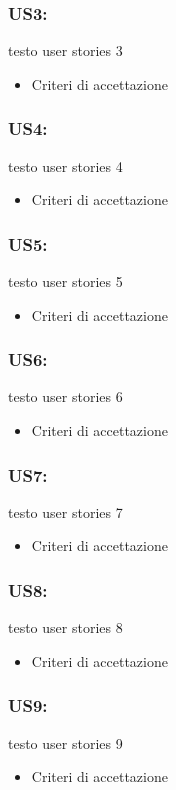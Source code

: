\documentclass[12pt]{article}
\begin{document}
\subsubsection{US3:}
testo user stories 3
\begin{itemize}
    \item Criteri di accettazione
\end{itemize}
\subsubsection{US4:}
testo user stories 4
\begin{itemize}
    \item Criteri di accettazione
\end{itemize}
\subsubsection{US5:}
testo user stories 5
\begin{itemize}
    \item Criteri di accettazione
\end{itemize}
\subsubsection{US6:}
testo user stories 6
\begin{itemize}
    \item Criteri di accettazione
\end{itemize}
\subsubsection{US7:}
testo user stories 7
\begin{itemize}
    \item Criteri di accettazione
\end{itemize}
\subsubsection{US8:}
testo user stories 8
\begin{itemize}
    \item Criteri di accettazione
\end{itemize}
\subsubsection{US9:}
testo user stories 9
\begin{itemize}
    \item Criteri di accettazione
\end{itemize}
\end{document}
